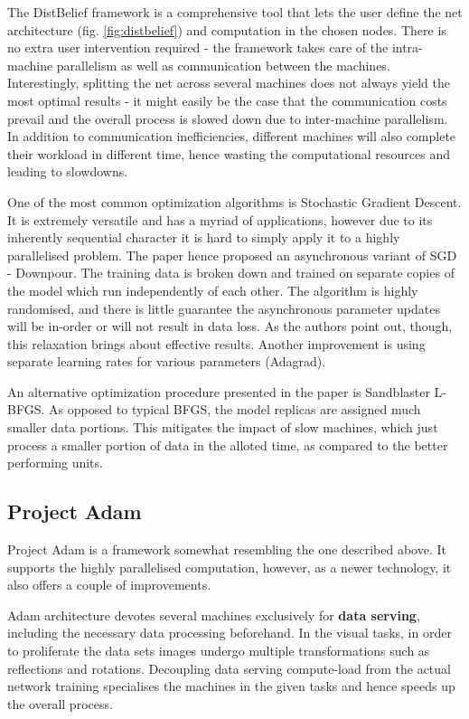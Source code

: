 \documentclass[a4paper, 12pt]{article}
\numberwithin{equation}{section}
\begin{document}
	The DistBelief framework is a comprehensive tool that lets the user define the net architecture (fig. \ref{fig:distbelief}) and computation in the chosen nodes. There is no extra user intervention required - the framework takes care of the intra-machine parallelism as well as communication between the machines. Interestingly, splitting the net across several machines does not always yield the most optimal results - it might easily be the case that the communication costs prevail and the overall process is slowed down due to inter-machine parallelism. In addition to communication inefficiencies, different machines will also complete their workload in different time, hence wasting the computational resources and leading to slowdowns.
	
	One of the most common optimization algorithms is Stochastic Gradient Descent. It is extremely versatile and has a myriad of applications, however due to its inherently sequential character it is hard to simply apply it to a highly parallelised problem. The paper hence proposed an asynchronous variant of SGD - Downpour. The training data is broken down and trained on separate copies of the model which run independently of each other. The algorithm is highly randomised, and there is little guarantee the asynchronous parameter updates will be in-order or will not result in data loss. As the authors point out, though, this relaxation brings about effective results. Another improvement is using separate learning rates for various parameters (Adagrad).
	
	An alternative optimization procedure presented in the paper is Sandblaster L-BFGS. As opposed to typical BFGS, the model replicas are assigned much smaller data portions. This mitigates the impact of slow machines, which just process a smaller portion of data in the alloted time, as compared to the better performing units.		 
	
	\subsection{Project Adam}
	
	Project Adam is a framework somewhat resembling the one described above. It supports the highly parallelised computation, however, as a newer technology, it also offers a couple of improvements.
	
	Adam architecture devotes several machines exclusively for \textbf{data serving}, including the necessary data processing beforehand. In the visual tasks, in order to proliferate the data sets images undergo multiple transformations such as reflections and rotations. Decoupling data serving compute-load from the actual network training specialises the machines in the given tasks and hence speeds up the overall process.
	
\end{document}
